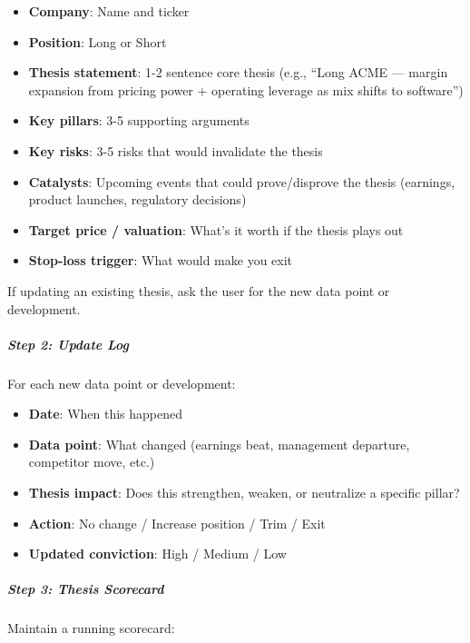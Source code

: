\documentclass[11pt]{article}
\begin{document}
\begin{itemize}[leftmargin=*,itemsep=2pt,topsep=2pt]
\item {} \textbf{Company}: Name and ticker
\item {} \textbf{Position}: Long or Short
\item {} \textbf{Thesis statement}: 1-2 sentence core thesis (e.g., ``Long ACME — margin expansion from pricing power + operating leverage as mix shifts to software'')
\item {} \textbf{Key pillars}: 3-5 supporting arguments
\item {} \textbf{Key risks}: 3-5 risks that would invalidate the thesis
\item {} \textbf{Catalysts}: Upcoming events that could prove/disprove the thesis (earnings, product launches, regulatory decisions)
\item {} \textbf{Target price / valuation}: What's it worth if the thesis plays out
\item {} \textbf{Stop-loss trigger}: What would make you exit
\end{itemize}

If updating an existing thesis, ask the user for the new data point or development.


\subparagraph{Step 2: Update Log}\mbox{}\par

For each new data point or development:


\begin{itemize}[leftmargin=*,itemsep=2pt,topsep=2pt]
\item {} \textbf{Date}: When this happened
\item {} \textbf{Data point}: What changed (earnings beat, management departure, competitor move, etc.)
\item {} \textbf{Thesis impact}: Does this strengthen, weaken, or neutralize a specific pillar?
\item {} \textbf{Action}: No change / Increase position / Trim / Exit
\item {} \textbf{Updated conviction}: High / Medium / Low
\end{itemize}

\subparagraph{Step 3: Thesis Scorecard}\mbox{}\par

Maintain a running scorecard:
\end{document}
